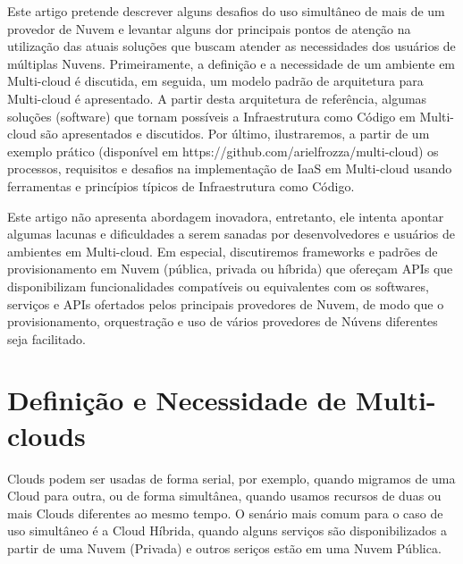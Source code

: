 \documentclass[12pt]{article}
\begin{document}
	    Este artigo pretende descrever alguns desafios do uso simultâneo de mais de um provedor de Nuvem e levantar alguns dor principais pontos de atenção na utilização das atuais soluções que buscam atender as necessidades dos usuários de múltiplas Nuvens. Primeiramente, a definição e a necessidade de um ambiente em Multi-cloud é discutida, em seguida, um modelo padrão de arquitetura para Multi-cloud é apresentado. A partir desta arquitetura de referência, algumas soluções (software) que tornam possíveis a Infraestrutura como Código em Multi-cloud são apresentados e discutidos. Por último, ilustraremos, a partir de um exemplo prático (disponível em https://github.com/arielfrozza/multi-cloud) os processos, requisitos e desafios na implementação de IaaS em Multi-cloud usando ferramentas e princípios típicos de Infraestrutura como Código.
	    
	    Este artigo não apresenta abordagem inovadora, entretanto, ele intenta apontar algumas lacunas e dificuldades a serem sanadas por desenvolvedores e usuários de ambientes em Multi-cloud. Em especial, discutiremos frameworks e padrões de provisionamento em Nuvem (pública, privada ou híbrida) que ofereçam APIs que disponibilizam funcionalidades compatíveis ou equivalentes com os softwares,  serviços e APIs ofertados pelos principais provedores de Nuvem, de modo que o provisionamento, orquestração e uso de vários provedores de Núvens diferentes seja facilitado.
		
		
	\section{Definição e Necessidade de Multi-clouds}
	
	Clouds podem ser usadas de forma serial, por exemplo, quando migramos de uma Cloud para outra, ou de forma simultânea, quando usamos recursos de duas ou mais Clouds diferentes ao mesmo tempo. O senário mais comum para o caso de uso simultâneo é a Cloud Híbrida, quando alguns serviços são disponibilizados a partir de uma Nuvem (Privada) e outros seriços estão em uma Nuvem Pública.
	
\end{document}
